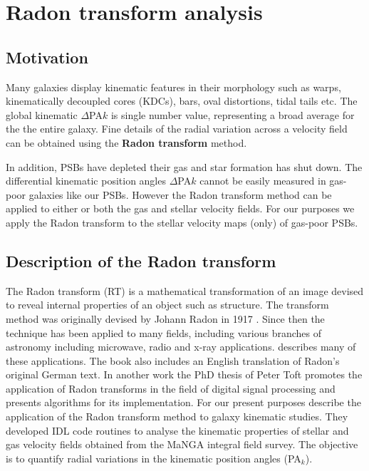\section{Radon transform analysis}
\label{sec:methods-II-Radon}

\subsection{Motivation}
\label{sec:motivation}

Many galaxies display kinematic features in their morphology such as warps, kinematically decoupled cores (KDCs), bars, oval distortions, tidal tails etc. The global kinematic $\Delta$PA${k}$ is single number value, representing a broad average for the the entire galaxy. Fine details of the radial variation across a velocity field can be obtained using the \textbf{Radon transform} method.

In addition, PSBs have depleted their gas and star formation has shut down. The differential kinematic position angles $\Delta$PA${k}$ cannot be easily measured in gas-poor galaxies like our PSBs. However the Radon transform method can be applied to either or both the gas and stellar velocity fields. For our purposes we apply the Radon transform to the stellar velocity maps (only) of gas-poor PSBs. 


\subsection{Description of the Radon transform}

The Radon transform (RT) is a mathematical transformation of an image devised to reveal internal properties of an object such as structure. The transform method was originally devised by Johann Radon in 1917 \citep{radon1917determination}. Since then the technique has been applied to many fields, including various branches of astronomy including microwave, radio and x-ray applications. \citet{deans2007radon} describes many of these applications. The book also includes an English translation of Radon's original German text. In another work the PhD thesis of  Peter Toft \citet{7910dc8d5b654c90ac4bc94c67d06f01} promotes the application of Radon transforms in the field of digital signal processing and presents algorithms for its implementation. For our present purposes \cite{2018MNRAS.480.2217S} describe the application of the Radon transform method to galaxy kinematic studies. They developed IDL code routines to analyse the kinematic properties of stellar and gas velocity fields obtained from the MaNGA integral field survey. The objective is to quantify radial variations in the kinematic position angles (PA$_{k}$).

